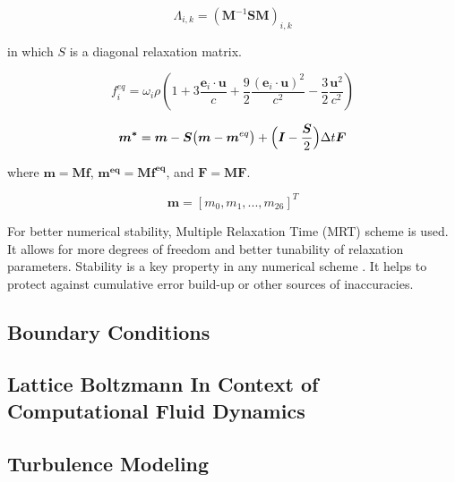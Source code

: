 \begin{equation}
	\label{eq:collision-operator}
	\Lambda_{i,k} = (\bm{M}^{-1}\bm{SM})_{i,k}
\end{equation}

in which $S$ is a diagonal relaxation matrix.

\begin{equation}
	\label{eq:feq}
	f_i^{eq} = \omega_i \rho \left( 1+3\frac{\bm{e}_i \cdot \bm{u}}{c} + \frac{9}{2}\frac{(\bm{e}_i \cdot \bm{u})^2}{c^2}-\frac{3}{2}\frac{\bm{u}^2}{c^2}\right)
\end{equation}


\begin{equation}
	\label{eq:collision-moment-space}
	\small
	\bm{m^*}=\bm{m}-\bm{S}\big(\bm{m}-\bm{m}^{eq}\big)+\Big(\bm{I}-\frac{\bm{S}}{2}\Big)\Delta t\bm{F}
\end{equation}

where $\bm{m}=\bm{Mf}$, $\bm{m^{eq}}=\bm{Mf^{eq}}$, and $\bm{F}=\bm{MF}$.


\begin{equation}
	\label{eq:moments}
	\bm{m} = [m_0, m_1,...,m_{26}]^T
\end{equation}

For better numerical stability, Multiple Relaxation Time (MRT) scheme is used. It allows for more degrees of freedom and better tunability of relaxation parameters. Stability is a key property in any numerical scheme \cite{succi2001lattice}. It helps to protect against cumulative error build-up or other sources of inaccuracies.


\subsection{Boundary Conditions}

\subsection{Lattice Boltzmann In Context of Computational Fluid Dynamics}





\subsection{Turbulence Modeling}


